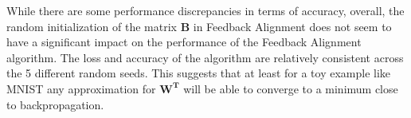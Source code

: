 \documentclass[12pt, letterpaper]{article}
\begin{document}
While there are some performance discrepancies in terms of accuracy, overall, the random initialization of the matrix $\mathbf{B}$ in Feedback Alignment does not seem to have a significant impact on the performance of the Feedback Alignment algorithm. The loss and accuracy of the algorithm are relatively consistent across the 5 different random seeds. This suggests that at least for a toy example like MNIST any approximation for $\mathbf{W^T}$ will be able to converge to a minimum close to backpropagation. 
\end{document}
